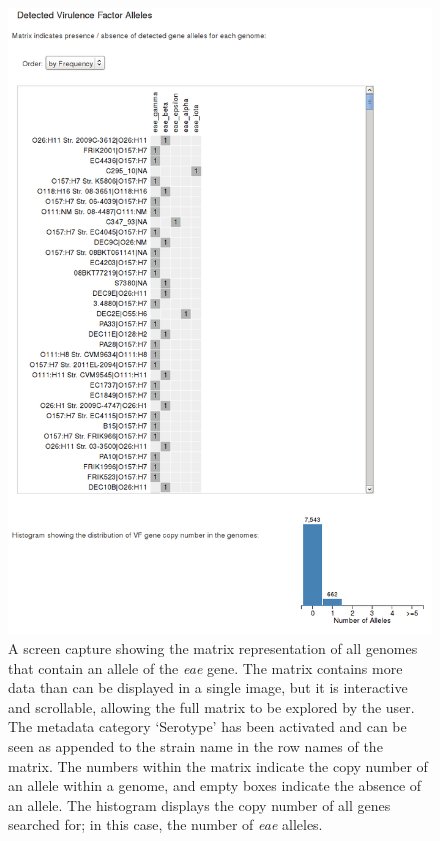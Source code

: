 \documentclass[doublespacing, linenumbers]{bmcart}
\begin{document}
\begin{backmatter}
\newpage
\begin{figure}[h!]
  \includegraphics[width=1\columnwidth]{images/vf_output.png}
  \caption{A screen capture showing the matrix representation of all genomes that contain an allele of the \textit{eae} gene.  The matrix contains more data than can be displayed in a single image, but it is interactive and scrollable, allowing the full matrix to be explored by the user. The metadata category `Serotype' has been activated and can be seen as appended to the strain name in the row names of the matrix. The numbers within the matrix indicate the copy number of an allele within a genome, and empty boxes indicate the absence of an allele. The histogram displays the copy number of all genes searched for; in this case, the number of \textit{eae} alleles.}
  \label{fig:vf_output}
\end{figure}


\end{backmatter}
\end{document}
